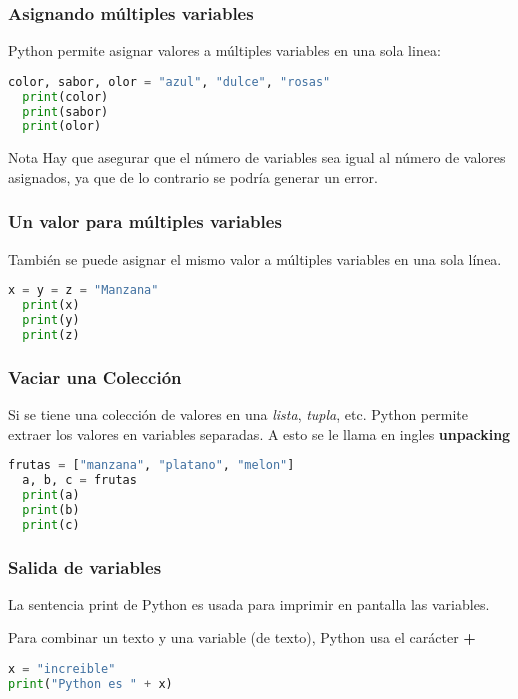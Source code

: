 \begin{frame}[fragile]
  \frametitle{Asignando múltiples variables}

  Python permite asignar valores a múltiples variables en una sola linea:

  \vspace{\baselineskip}
  \begin{lstlisting}[language=Python]
  color, sabor, olor = "azul", "dulce", "rosas"
  print(color)
  print(sabor)
  print(olor)
  \end{lstlisting}

  \begin{alertblock}{Nota}
    Hay que asegurar que el número de variables sea igual al número de valores
    asignados, ya que de lo contrario se podría generar un error.
  \end{alertblock}
\end{frame}

\begin{frame}[fragile]
  \frametitle{Un valor para múltiples variables}

  También se puede asignar el mismo valor a múltiples variables en una sola
  línea.

  \vspace{\baselineskip}
  \begin{lstlisting}[language=Python]
  x = y = z = "Manzana"
  print(x)
  print(y)
  print(z)
  \end{lstlisting}
\end{frame}

\begin{frame}[fragile]
  \frametitle{Vaciar una Colección}

  Si se tiene una colección de valores en una \textit{lista}, \textit{tupla},
  etc. Python permite extraer los valores en variables separadas. A esto
  se le llama en ingles \textbf{unpacking}

  \vspace{\baselineskip}
  \begin{lstlisting}[language=Python]
  frutas = ["manzana", "platano", "melon"]
  a, b, c = frutas
  print(a)
  print(b)
  print(c)
  \end{lstlisting}
\end{frame}

\begin{frame}[fragile]
  \frametitle{Salida de variables}

  La sentencia \textcolor{codeKeyword}{print} de Python es usada para
  imprimir en pantalla las variables.

  \vspace{\baselineskip}
  Para combinar un texto y una variable (de texto), Python usa el carácter
  \textbf{+}

  \begin{lstlisting}[language=Python]
x = "increible"
print("Python es " + x)
  \end{lstlisting}
\end{frame}

